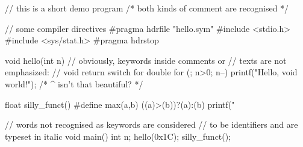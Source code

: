 


\BeginC
// this is a short demo program
/* both kinds of comment are recognised */

// some compiler directives
#pragma hdrfile "hello.sym"
#include <stdio.h>
#include <sys/stat.h>
#pragma hdrstop

void hello(int n)
{
  // obviously, keywords inside comments or
  // texts are not emphasized:
  // void return switch for double
  for (; n>0; n--)
    printf("Hello, void world!\n");
    /*     ^ isn't that beautiful?   */
}

float silly_funct()
{
  #define max(a,b)   ((a)>(b))?(a):(b)
  printf("%
}

// words not recognised as keywords are considered
// to be identifiers and are typeset in italic
void main()
{
  int n;
  hello(0x1C);
  silly_funct();
}
\EndC


\bye
